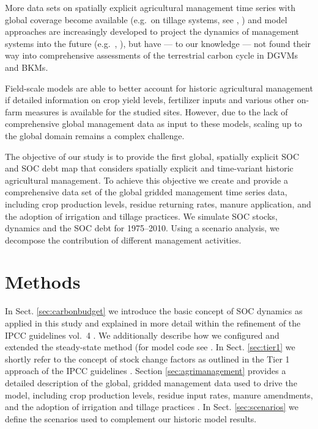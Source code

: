 \documentclass[gc, manuscript]{copernicus}
\begin{document}
More data sets on spatially explicit agricultural management time series with global coverage become available (e.g.~on tillage systems, see \citep{porwollik_generating_2018}, \citep{prestele_spatially_2018}) and model approaches are increasingly developed to project the dynamics of management systems into the future (e.g.~\citep{iizumi_modeling_2019}, \citep{minoli_modelling_2019}), but have --- to our knowledge --- not found their way into comprehensive assessments of the terrestrial carbon cycle in DGVMs and BKMs.

Field-scale models \citep[\citet{coleman_simulating_1997}, \citet{smith_estimating_2010}, \citet{taghizadeh-toosi_c-tool_2014}]{del_grosso_simulated_2001} are able to better account for historic agricultural management if detailed information on crop yield levels, fertilizer inputs and various other on-farm measures is available for the studied sites. However, due to the lack of comprehensive global management data as input to these models, scaling up to the global domain remains a complex challenge.

The objective of our study is to provide the first global, spatially explicit SOC and SOC debt map that considers spatially explicit and time-variant historic agricultural management. To achieve this objective we create and provide a comprehensive data set of the global gridded management time series data, including crop production levels, residue returning rates, manure application, and the adoption of irrigation and tillage practices. We simulate SOC stocks, dynamics and the SOC debt for 1975--2010. Using a scenario analysis, we decompose the contribution of different management activities.
\newpage

\hypertarget{methods}{%
\section{Methods}\label{methods}}

In Sect. \ref{sec:carbonbudget} we introduce the basic concept of SOC dynamics as applied in this study and explained in more detail within the refinement of the IPCC guidelines vol.~4 \citep{calvo_buendia_ipcc_2019}. We additionally describe how we configured and extended the steady-state method (for model code see \citep{karstens_mrsoil_2020}. In Sect. \ref{sec:tier1} we shortly refer to the concept of stock change factors as outlined in the Tier 1 approach of the IPCC guidelines \citep{eggleston_ipcc_2006, calvo_buendia_ipcc_2019}.
Section \ref{sec:agrimanagement} provides a detailed description of the global, gridded management data used to drive the model, including crop production levels, residue input rates, manure amendments, and the adoption of irrigation and tillage practices \citep[for model code see][]{bodirsky_mrcommons_2020}. In Sect. \ref{sec:scenarios} we define the scenarios used to complement our historic model results.
\end{document}
